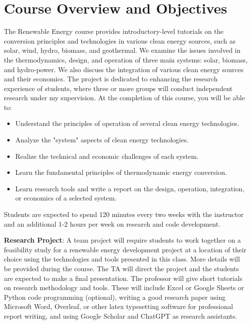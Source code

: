 \documentclass[11pt]{article}
\begin{document}
\section{Course Overview and Objectives}
The Renewable Energy course provides introductory-level tutorials on the 
conversion principles and technologies in various clean energy sources, such as solar, wind, hydro, biomass, and geothermal. We examine the issues involved in the thermodynamics, design, and operation of three main systems: solar, biomass, and hydro-power. We also discuss the integration of various clean energy sources and their economics. The project is dedicated to enhancing the research experience of students, where three or more groups will conduct independent research under my supervision. At the completion of this course, you will be able to:
\begin{itemize}
    \item Understand the principles of operation of several clean energy technologies.
    \item Analyze the "system" aspects of clean energy technologies.
     \item Realize the technical and economic challenges of each system.
    \item Learn the fundamental principles of thermodynamic energy conversion.
    \item Learn research tools and write a report on the design, operation, integration, or economics of a selected system.
\end{itemize}


Students are expected to spend 120 minutes every two weeks with the instructor and an additional 1-2 hours per week on research and code development.

\textbf{Research Project}: A team project will require students to work together on a feasibility study for a renewable energy development project at a location of their choice using the technologies and tools presented in this class. More details will be provided during the course. The TA will direct the project and the students are expected to make a final presentation. The professor will give short tutorials on research methodology and tools.  These will include Excel or Google Sheets or Python code programming (optional), writing a good research paper using Microsoft Word, Overleaf, or other latex typesetting software for professional report writing, and using Google Scholar and ChatGPT as research assistants.

\newpage
\end{document}
